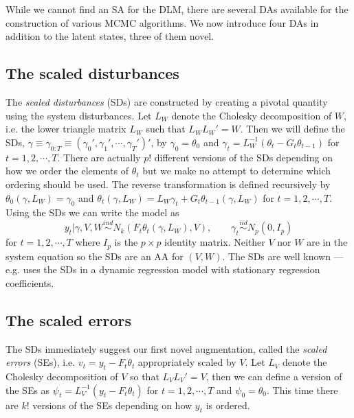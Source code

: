 \documentclass[12pt]{article}
\begin{document}
While we cannot find an SA for the DLM, there are several DAs available for the construction of various MCMC algorithms. We now introduce four DAs in addition to the latent states, three of them novel.

\subsection{The scaled disturbances}\label{sec:DAs:dist}

The {\it scaled disturbances} (SDs) are constructed by creating a pivotal quantity using the system disturbances. Let $L_W$ denote the Cholesky decomposition of $W$, i.e. the lower triangle matrix $L_W$ such that $L_WL_W' =W$. Then we will define the SDs, $\gamma\equiv\gamma_{0:T}\equiv(\gamma_0',\gamma_1',\cdots,\gamma_T')'$, by $\gamma_0=\theta_0$ and $\gamma_t = L_W^{-1}(\theta_t-G_t\theta_{t-1})$ for $t=1,2,\cdots,T$. There are actually $p!$ different versions of the SDs depending on how we order the elements of $\theta_t$ but we make no attempt to determine which ordering should be used. The reverse transformation is defined recursively by $\theta_0(\gamma,L_W)=\gamma_0$ and $\theta_t(\gamma,L_W)=L_W\gamma_t + G_t\theta_{t-1}(\gamma,L_W)$ for $t=1,2,\cdots,T$. Using the SDs we can write the model as
\begin{equation}
  y_t|\gamma,V,W  \stackrel{ind}{\sim} N_k\left(F_t\theta_t(\gamma,L_W), V\right), \qquad
  \gamma_t  \stackrel{iid}{\sim}N_p(0,I_p) \label{dlmdistmodel}
\end{equation}
for $t=1,2,\cdots,T$ where $I_p$ is the $p\times p$ identity matrix. Neither $V$ nor $W$ are in the system equation so the SDs are an AA for $(V,W)$. The SDs are well known --- e.g. \citet{fruhwirth2004efficient} uses the SDs in a dynamic regression model with stationary regression coefficients.

\subsection{The scaled errors}\label{sec:DAs:error}
The SDs immediately suggest our first novel augmentation, called the {\it scaled errors} (SEs), i.e. $v_t=y_t - F_t\theta_t$ appropriately scaled by $V$. Let $L_V$ denote the Cholesky decomposition of $V$ so that $L_VL_V'=V$, then we can define a version of the SEs as $\psi_t = L_V^{-1}(y_t - F_t\theta_t)$ for $t=1,2,\cdots,T$ and $\psi_0 = \theta_0$. This time there are $k!$ versions of the SEs depending on how $y_t$ is ordered.
\end{document}
